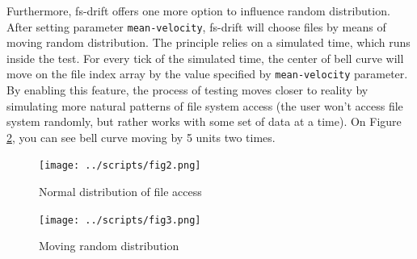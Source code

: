 \documentclass[
  color, %
  table, %
  lof,   %
  lot,   %
]{fithesis3}
\begin{document}
Furthermore, fs-drift offers one more option to influence random distribution. After setting parameter \texttt{mean-velocity}, fs-drift will choose files by means of moving random distribution. The principle relies on a simulated time, which runs inside the test. For every tick of the simulated time, the center of bell curve will move on the file index array by the value specified by \texttt{mean-velocity} parameter. By enabling this feature, the process of testing moves closer to reality by simulating more natural patterns of file system access (the user won't access file system randomly, but rather works with some set of data at a time). On Figure \ref{fig:rand3}, you can see bell curve moving by 5 units two times.

\begin{figure}[!htb]
    \begin{minipage}{\textwidth}
        \centering
        \texttt{[image: ../scripts/fig2.png]}
        \caption{Normal distribution of file access}

\label{fig:rand2}
    \end{minipage}

\end{figure}
\begin{figure}
    \begin{minipage}{\textwidth}
        \centering
        \texttt{[image: ../scripts/fig3.png]}
        \caption{Moving random distribution}
\label{fig:rand3}
    \end{minipage}
\end{figure}


\end{document}
